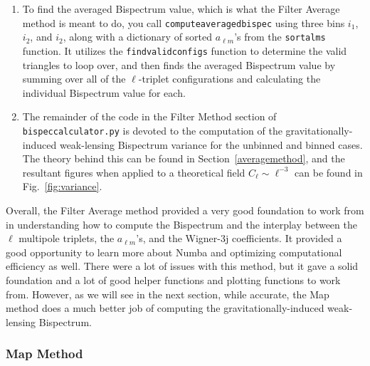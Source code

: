 \documentclass[11pt]{article}
\renewcommand{\_}[1]{\underline{ #1 }}
\newcommand{\us}{\textunderscore}
\begin{document}
{\begin{enumerate}
\begin{enumerate}
    \end{enumerate}
    This function computes the Bispectrum for a single set of $\ell$-triplets, so it more serves as a helper function to compute the Bispectrum for a range of $\ell$-triplets, which is described in the next enumerated item.
    \item To find the averaged Bispectrum value, which is what the Filter Average method is meant to do, you call \texttt{compute\us averaged\us bispec} using three bins $i_1$, $i_2$, and $i_2$, along with a dictionary of sorted $a_{\ell m}$'s from the \texttt{sort\us alms} function. It utilizes the \texttt{find\us valid\us configs} function to determine the valid triangles to loop over, and then finds the averaged Bispectrum value by summing over all of the $\ell$-triplet configurations and calculating the individual Bispectrum value for each.
    \item The remainder of the code in the Filter Method section of \texttt{bispec\us calculator.py} is devoted to the computation of the gravitationally-induced weak-lensing Bispectrum variance for the unbinned and binned cases. The theory behind this can be found in Section~\ref{averagemethod}, and the resultant figures when applied to a theoretical field $C_{\ell} \sim \ell^{-3}$ can be found in Fig.~\ref{fig:variance}.
\end{enumerate}

Overall, the Filter Average method provided a very good foundation to work from in understanding how to compute the Bispectrum and the interplay between the $\ell$ multipole triplets, the $a_{\ell m}$'s, and the Wigner-3j coefficients. It provided a good opportunity to learn more about Numba and optimizing computational efficiency as well. There were a lot of issues with this method, but it gave a solid foundation and a lot of good helper functions and plotting functions to work from. However, as we will see in the next section, while accurate, the Map method does a much better job of computing the gravitationally-induced weak-lensing Bispectrum.

\subsubsection{Map Method}\label{mapmethodcode}

}
\end{document}
